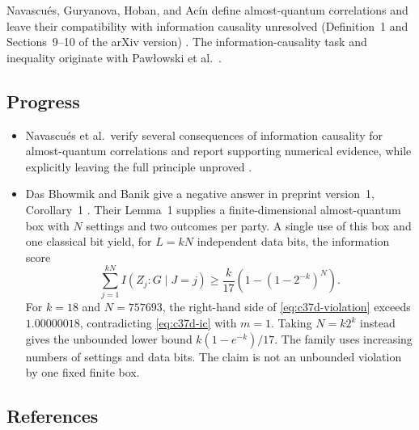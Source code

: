 Navascu\'es, Guryanova, Hoban, and Ac\'in define almost-quantum correlations
and leave their compatibility with information causality unresolved
(Definition~1 and Sections~9--10 of the arXiv version)
.
The information-causality task and inequality originate with
Paw\l{}owski et al.\ .

\subsection*{Progress}

\begin{itemize}
  \item Navascu\'es et al.\ verify several consequences of information causality
for almost-quantum correlations and report supporting numerical evidence,
while explicitly leaving the full principle unproved
.

  \item Das Bhowmik and Banik give a negative answer in preprint version~1,
Corollary~1 .
Their Lemma~1 supplies a finite-dimensional almost-quantum box with $N$
settings and two outcomes per party.
A single use of this box and one
classical bit yield, for $L=kN$ independent data bits, the information score
\begin{equation}
  \sum_{j=1}^{kN} I(Z_j:G\mid J=j)
  \geq \frac{k}{17}\left(1-(1-2^{-k})^N\right).
  \label{eq:c37d-violation}
\end{equation}
For $k=18$ and $N=757693$, the right-hand side of
\eqref{eq:c37d-violation} exceeds $1.00000018$, contradicting
\eqref{eq:c37d-ic} with $m=1$.
Taking $N=k2^k$ instead gives the unbounded lower bound
$k(1-e^{-k})/17$.
The family uses increasing numbers of settings and data
bits. The claim is not an unbounded violation by one fixed finite box.
\end{itemize}

\subsection*{References}

